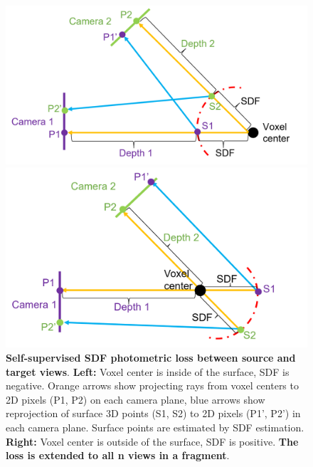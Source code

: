\begin{figure}
\begin{minipage}{0.55\linewidth}
  \centerline{\includegraphics[width=1.0\textwidth]{figures/sdf_loss_a.png}}
\end{minipage}
\hfill
\begin{minipage}{0.51\linewidth}
  \centerline{\includegraphics[width=1.0\textwidth]{figures/sdf_loss_b.png}}
\end{minipage}
\vspace{-5mm}
\caption{\textbf{Self-supervised SDF photometric loss between source and target views}. \textbf{Left:} Voxel center is inside of the surface, SDF is negative. Orange arrows show projecting rays from voxel centers to 2D pixels (P1, P2) on each camera plane, blue arrows show reprojection of surface 3D points (S1, S2) to 2D pixels (P1', P2') in each camera plane. Surface points are estimated by SDF estimation. \textbf{Right:} Voxel center is outside of the surface, SDF is positive. \textbf{The loss is extended to all n views in a fragment}.}
\label{fig:sdf photometric loss}
\vspace{-5mm}
\end{figure}

